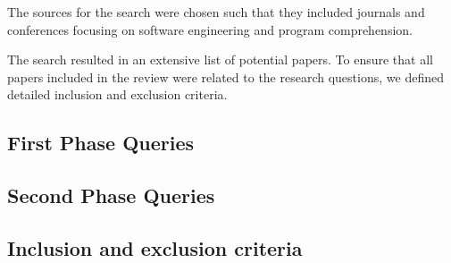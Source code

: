 The sources for the search were chosen such that they included journals and conferences focusing on software engineering and program comprehension. 

The search resulted in an extensive list of potential papers. To ensure that all papers included in the review were related to the research questions, we defined detailed inclusion and exclusion criteria.  

\subsection{First Phase Queries}


\subsection{Second Phase Queries}


\subsection{Inclusion and exclusion criteria}







